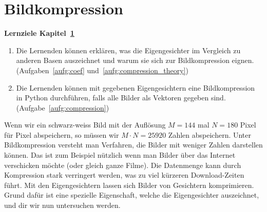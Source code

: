 \section{Bildkompression} \label{sec:compression}
\begin{tcolorbox}
	\centerline{\textbf{Lernziele Kapitel~\ref{sec:compression}}}
	\begin{enumerate}[leftmargin=*,label=\thesection.\arabic*]
		\item \label{item:compression_theory} Die Lernenden können erklären, was die Eigengesichter im Vergleich zu anderen Basen auszeichnet und warum sie sich zur Bildkompression eignen.\\
		(Aufgaben~\ref{aufg:coef} und~\ref{aufg:compression_theory})
		\item \label{item:compression_code} Die Lernenden können mit gegebenen Eigengesichtern eine Bildkompression in Python durchführen, falls alle Bilder als Vektoren gegeben sind.\\
		(Aufgabe~\ref{aufg:compression})
	\end{enumerate}
\end{tcolorbox}
Wenn wir ein schwarz-weiss Bild mit der Auflösung $M=144$ mal $N=180$ Pixel für Pixel abspeichern, so müssen wir $M\cdot N=25920$ Zahlen abspeichern.
Unter Bildkompression versteht man Verfahren, die Bilder mit weniger Zahlen darstellen können.
Das ist zum Beispiel nützlich wenn man Bilder über das Internet verschicken möchte (oder gleich ganze Filme).
Die Datenmenge kann durch Kompression stark verringert werden, was zu viel kürzeren Download-Zeiten führt.
Mit den Eigengesichtern lassen sich Bilder von Gesichtern komprimieren.
Grund dafür ist eine spezielle Eigenschaft, welche die Eigengesichter auszeichnet, und dir wir nun untersuchen werden.

